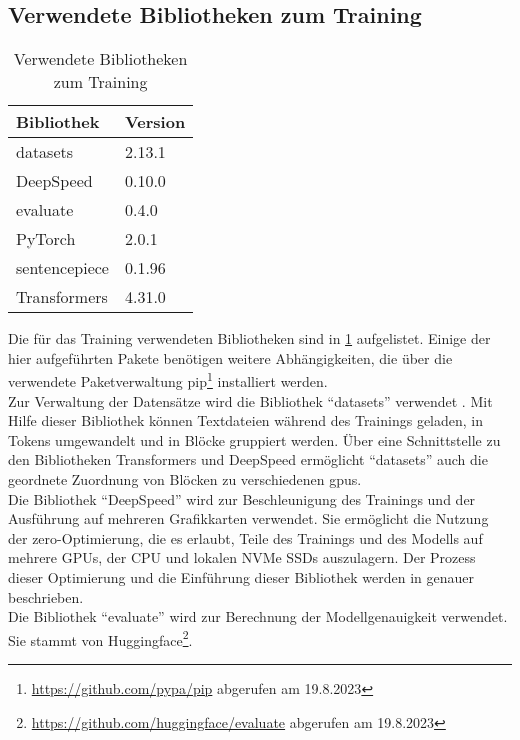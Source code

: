 \subsection{Verwendete Bibliotheken zum Training}
\begin{table}
    \centering
    \begin{tabular}{ll}
        \toprule
        \textbf{Bibliothek} & \textbf{Version} \\
        \midrule
        datasets            & 2.13.1           \\
        DeepSpeed           & 0.10.0           \\
        evaluate            & 0.4.0            \\
        PyTorch             & 2.0.1            \\
        sentencepiece       & 0.1.96           \\
        Transformers        & 4.31.0           \\
        \bottomrule
    \end{tabular}
    \caption{Verwendete Bibliotheken zum Training}\label{tab:training-libraries}
\end{table}
Die für das Training verwendeten Bibliotheken sind in \cref{tab:training-libraries} aufgelistet.
Einige der hier aufgeführten Pakete benötigen weitere Abhängigkeiten, die über die verwendete Paketverwaltung \ac{pip}\footnote{\url{https://github.com/pypa/pip} abgerufen am 19.8.2023} installiert werden.\\

Zur Verwaltung der Datensätze wird die Bibliothek \enquote{datasets} verwendet \citep{datasets}.
Mit Hilfe dieser Bibliothek können Textdateien während des Trainings geladen, in Tokens umgewandelt und in Blöcke gruppiert werden.
Über eine Schnittstelle zu den Bibliotheken Transformers und DeepSpeed ermöglicht \enquote{datasets} auch die geordnete Zuordnung von Blöcken zu verschiedenen \ac{gpu}s.\\

Die Bibliothek \enquote{DeepSpeed} wird zur Beschleunigung des Trainings und der Ausführung auf mehreren Grafikkarten verwendet.
Sie ermöglicht die Nutzung der \ac{zero}-Optimierung, die es erlaubt, Teile des Trainings und des Modells auf mehrere GPUs, der CPU und lokalen NVMe SSDs auszulagern.
Der Prozess dieser Optimierung und die Einführung dieser Bibliothek werden in \citet{deepspeed} genauer beschrieben.\\

Die Bibliothek \enquote{evaluate} wird zur Berechnung der Modellgenauigkeit verwendet.
Sie stammt von Huggingface\footnote{\url{https://github.com/huggingface/evaluate} abgerufen am 19.8.2023}.\\

